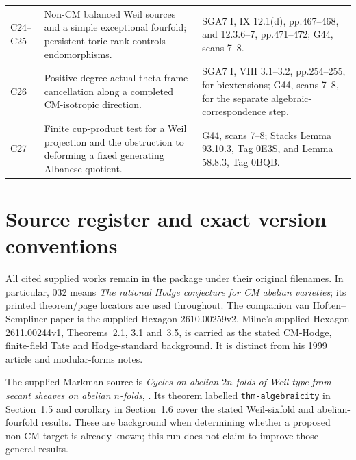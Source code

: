 \begin{longtable}{@{}p{.18\linewidth}p{.48\linewidth}p{.27\linewidth}@{}}
C24--C25 & Non-CM balanced Weil sources and a simple exceptional fourfold; persistent toric rank controls endomorphisms. & SGA7 I, IX 12.1(d), pp.467--468, and 12.3.6--7, pp.471--472; G44, scans 7--8.\\
C26 & Positive-degree actual theta-frame cancellation along a completed CM-isotropic direction. & SGA7 I, VIII 3.1--3.2, pp.254--255, for biextensions; G44, scans 7--8, for the separate algebraic-correspondence step.\\
C27 & Finite cup-product test for a Weil projection and the obstruction to deforming a fixed generating Albanese quotient. & G44, scans 7--8; Stacks Lemma 93.10.3, Tag 0E3S, and Lemma 58.8.3, Tag 0BQB.\\
\bottomrule
\end{longtable}

\section{Source register and exact version conventions}

All cited supplied works remain in the package under their original
filenames. In particular, 032 means
\emph{The rational Hodge conjecture for CM abelian varieties}; its
printed theorem/page locators are used throughout. The companion
van Hoften--Sempliner paper is the supplied Hexagon 2610.00259v2.
Milne's supplied Hexagon 2611.00244v1, Theorems~2.1, 3.1 and~3.5,
is carried as the stated CM-Hodge, finite-field Tate and Hodge-standard
background. It is distinct from his 1999 article and modular-forms notes.

The supplied Markman source is \emph{Cycles on abelian $2n$-folds of
Weil type from secant sheaves on abelian $n$-folds},
.
Its theorem labelled \texttt{thm-algebraicity} in Section~1.5 and
corollary in Section~1.6 cover the stated Weil-sixfold and
abelian-fourfold results. These are background when determining
whether a proposed non-CM target is already known; this run does
not claim to improve those general results.

